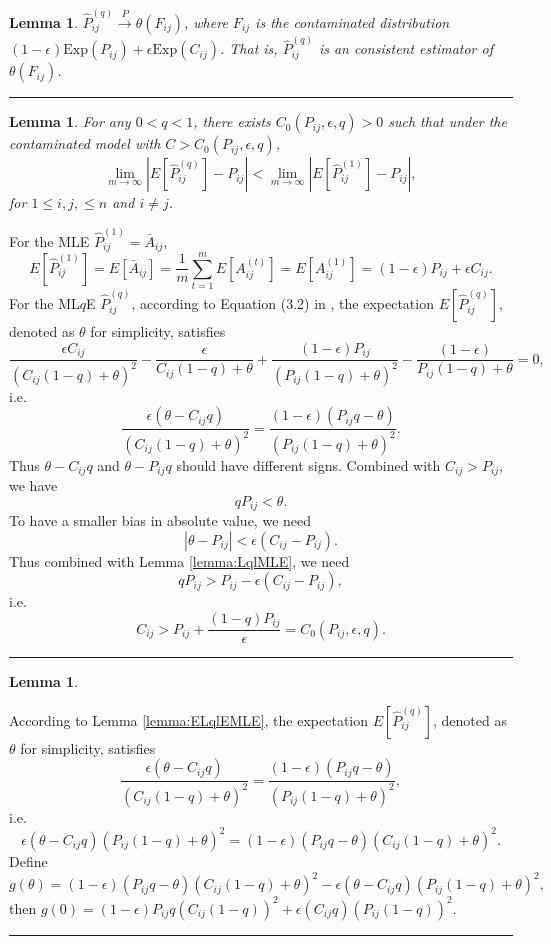 \documentclass[a4paper]{article}
\newenvironment{proof}{{\bf Proof:  }}{\hfill\rule{2mm}{2mm}}
\newtheorem{lemma}[fact]{Lemma}
\begin{document}
\begin{lemma}
$\hat{P}_{ij}^{(q)} \stackrel{P}{\to} \theta(F_{ij})$, where $F_{ij}$ is the contaminated distribution $(1-\epsilon) \mathrm{Exp}(P_{ij}) + \epsilon \mathrm{Exp}(C_{ij})$. That is, $\hat{P}_{ij}^{(q)}$ is an consistent estimator of $\theta(F_{ij})$.
\end{lemma}
\begin{proof}

\end{proof}






\begin{lemma}%
For any $0 < q < 1$, there exists $C_0(P_{ij}, \epsilon, q) > 0$ such that under the contaminated model with $C > C_0(P_{ij}, \epsilon, q)$,
\[
	\lim_{m \to \infty} \left| E[\hat{P}^{(q)}_{ij}] - P_{ij} \right| < 
    \lim_{m \to \infty} \left| E[\hat{P}^{(1)}_{ij}] - P_{ij} \right|,
\]
for $1 \le i, j, \le n$ and $i \ne j$.
\end{lemma}
\label{lemma:ELqlEMLE}
\begin{proof}
For the MLE $\hat{P}^{(1)}_{ij} = \bar{A}_{ij}$,
\[
	E[\hat{P}^{(1)}_{ij}] = E[\bar{A}_{ij}]
    = \frac{1}{m} \sum_{t = 1}^m E[A_{ij}^{(t)}]
    = E[A_{ij}^{(1)}]
    = (1-\epsilon) P_{ij} + \epsilon C_{ij}.
\]
For the ML$q$E $\hat{P}^{(q)}_{ij}$, according to Equation (3.2) in \cite{ferrari2010}, the expectation $E[\hat{P}^{(q)}_{ij}]$, denoted as $\theta$ for simplicity, satisfies
\[
\frac{\epsilon C_{ij}}{(C_{ij}(1-q) + \theta)^2} - \frac{\epsilon}{C_{ij}(1-q) + \theta}
+\frac{(1-\epsilon) P_{ij}}{(P_{ij}(1-q) + \theta)^2} - \frac{(1-\epsilon)}{P_{ij}(1-q) + \theta}
= 0,
\]
i.e.
\[
\frac{\epsilon (\theta - C_{ij}q)}{(C_{ij}(1-q) + \theta)^2} =
\frac{(1-\epsilon) (P_{ij} q - \theta)}{(P_{ij}(1-q) + \theta)^2}.
\]
Thus $\theta - C_{ij} q$ and $\theta - P_{ij} q$ should have different signs. Combined with $C_{ij} > P_{ij}$, we have
\[
q P_{ij} < \theta.
\]
To have a smaller bias in absolute value, we need
\[
|\theta - P_{ij}| < \epsilon (C_{ij} - P_{ij}).
\]
Thus combined with Lemma \ref{lemma:LqlMLE}, we need
\[
q P_{ij} > P_{ij} - \epsilon(C_{ij} - P_{ij}),
\]
i.e.
\[
C_{ij} > P_{ij} + \frac{(1-q) P_{ij}}{\epsilon} = C_0(P_{ij}, \epsilon, q).
\]
\end{proof}




\begin{lemma}

\end{lemma}
\begin{proof}
According to Lemma \ref{lemma:ELqlEMLE}, the expectation $E[\hat{P}^{(q)}_{ij}]$, denoted as $\theta$ for simplicity, satisfies
\[
\frac{\epsilon (\theta - C_{ij}q)}{(C_{ij}(1-q) + \theta)^2} =
\frac{(1-\epsilon) (P_{ij} q - \theta)}{(P_{ij}(1-q) + \theta)^2},
\]
i.e.
\[
\epsilon (\theta - C_{ij}q) (P_{ij}(1-q) + \theta)^2 =
(1-\epsilon) (P_{ij} q - \theta) (C_{ij}(1-q) + \theta)^2.
\]
Define
\[
	g(\theta) = (1-\epsilon) (P_{ij} q - \theta) (C_{ij}(1-q) + \theta)^2 - \epsilon (\theta - C_{ij}q) (P_{ij}(1-q) + \theta)^2,
\]
then $g(0) = (1-\epsilon) P_{ij} q (C_{ij}(1-q))^2 + \epsilon ( C_{ij}q) (P_{ij}(1-q))^2$.
\end{proof}
\end{document}
